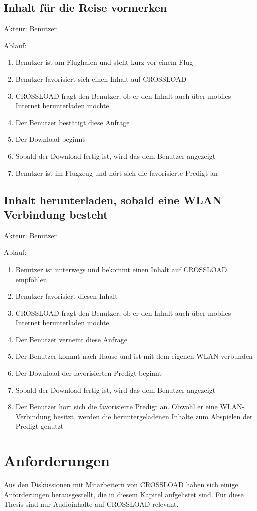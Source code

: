 \subsection{Inhalt für die Reise vormerken}
Akteur: Benutzer

Ablauf:
\begin{enumerate}
	\item Benutzer ist am Flughafen und steht kurz vor einem Flug
	\item Benutzer favorisiert sich einen Inhalt auf CROSSLOAD
	\item CROSSLOAD fragt den Benutzer, ob er den Inhalt auch über mobiles Internet herunterladen möchte
	\item Der Benutzer bestätigt diese Anfrage
	\item Der Download beginnt
	\item Sobald der Download fertig ist, wird das dem Benutzer angezeigt
	\item Benutzer ist im Flugzeug und hört sich die favorisierte Predigt an
\end{enumerate}

\subsection{Inhalt herunterladen, sobald eine WLAN Verbindung besteht}
Akteur: Benutzer

Ablauf:
\begin{enumerate}
	\item Benutzer ist unterwegs und bekommt einen Inhalt auf CROSSLOAD empfohlen
	\item Benutzer favorisiert diesen Inhalt
	\item CROSSLOAD fragt den Benutzer, ob er den Inhalt auch über mobiles Internet herunterladen möchte
	\item Der Benutzer verneint diese Anfrage
	\item Der Benutzer kommt nach Hause und ist mit dem eigenen WLAN verbunden
	\item Der Download der favorisierten Predigt beginnt
	\item Sobald der Download fertig ist, wird das dem Benutzer angezeigt
	\item Der Benutzer hört sich die favorisierte Predigt an. Obwohl er eine WLAN-Verbindung besitzt, werden die heruntergeladenen Inhalte zum Abspielen der Predigt genutzt
\end{enumerate}

\section{Anforderungen}
\label{Kap3:Anforderungen}
Aus den Diskussionen mit Mitarbeitern von CROSSLOAD haben sich einige Anforderungen herausgestellt, die in diesem Kapitel aufgelistet sind. Für diese Thesis sind nur Audioinhalte auf CROSSLOAD relevant. 


